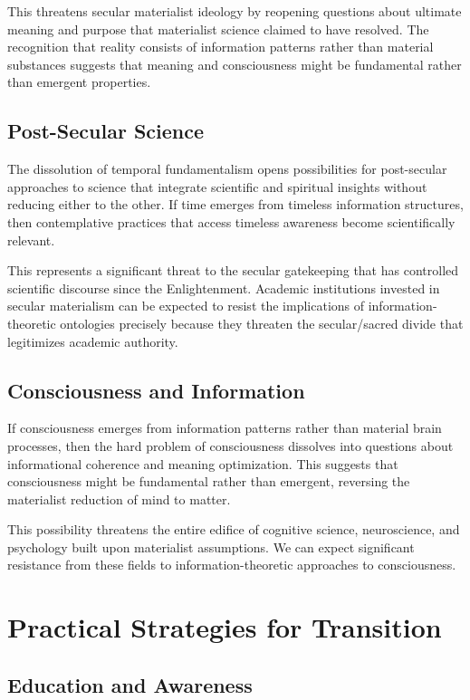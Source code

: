 \documentclass[12pt]{article}
\begin{document}
This threatens secular materialist ideology by reopening questions about ultimate meaning and purpose that materialist science claimed to have resolved. The recognition that reality consists of information patterns rather than material substances suggests that meaning and consciousness might be fundamental rather than emergent properties.

\subsection{Post-Secular Science}

The dissolution of temporal fundamentalism opens possibilities for post-secular approaches to science that integrate scientific and spiritual insights without reducing either to the other. If time emerges from timeless information structures, then contemplative practices that access timeless awareness become scientifically relevant.

This represents a significant threat to the secular gatekeeping that has controlled scientific discourse since the Enlightenment. Academic institutions invested in secular materialism can be expected to resist the implications of information-theoretic ontologies precisely because they threaten the secular/sacred divide that legitimizes academic authority.

\subsection{Consciousness and Information}

If consciousness emerges from information patterns rather than material brain processes, then the hard problem of consciousness dissolves into questions about informational coherence and meaning optimization. This suggests that consciousness might be fundamental rather than emergent, reversing the materialist reduction of mind to matter.

This possibility threatens the entire edifice of cognitive science, neuroscience, and psychology built upon materialist assumptions. We can expect significant resistance from these fields to information-theoretic approaches to consciousness.

\section{Practical Strategies for Transition}

\subsection{Education and Awareness}
\end{document}
